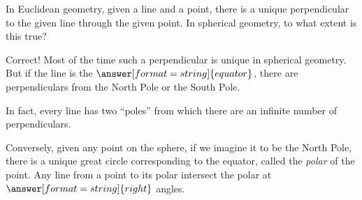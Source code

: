 \documentclass{ximera}
\begin{document}
%
\begin{problem}
In Euclidean geometry, given a line and a point, there is a unique perpendicular to the given line through the given point.  In spherical geometry, to what extent is this true? 
\begin{multipleChoice}
\end{multipleChoice}
\begin{problem}
Correct!  Most of the time such a perpendicular is unique in spherical geometry.  But if the line is the $\answer[format=string]{equator}$, there are 
 perpendiculars from the North Pole or the South Pole.  
\begin{problem}
In fact, every line has two ``poles'' from which there are an infinite number of perpendiculars.  

Conversely, given any point on the sphere, if we imagine it to be the North Pole, there is a unique great circle corresponding to the equator, called the \emph{polar} of the point.  Any line from a point to its polar intersect the polar at $\answer[format=string]{right}$ angles.  
\end{problem} 
\end{problem} 
\end{problem}
\end{document}
